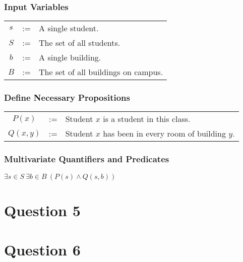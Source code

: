 \documentclass{article}
\begin{document}
\subsubsection{Input Variables}
\begin{center}
  \begin{tabular}{ccl}
    $s$ & := & A single student. \\
    $S$ & := & The set of all students. \\
    $b$ & := & A single building. \\
    $B$ & := & The set of all buildings on campus. \\
  \end{tabular}
\end{center}

\subsubsection{Define Necessary Propositions}
\begin{center}
  \begin{tabular}{ccl}
    $P(x)$ & := & Student $x$ is a student in this class. \\
    $Q(x,y)$ & := & Student $x$ has been in every room of building $y$. \\
  \end{tabular}
\end{center}

\subsubsection{Multivariate Quantifiers and Predicates}
\begin{center}
  $ \exists s \in S~\exists b \in B~(P(s) \land Q(s, b)) $
\end{center}

\newpage

\section{Question 5}

\newpage

\section{Question 6}

\end{document}
